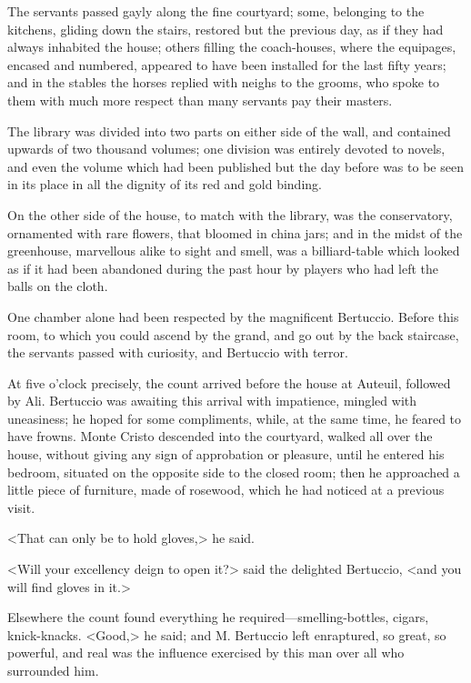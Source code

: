  The servants passed gayly along the fine courtyard; some, belonging to the kitchens, gliding down the stairs, restored but the previous day, as if they had always inhabited the house; others filling the coach-houses, where the equipages, encased and numbered, appeared to have been installed for the last fifty years; and in the stables the horses replied with neighs to the grooms, who spoke to them with much more respect than many servants pay their masters. 

 The library was divided into two parts on either side of the wall, and contained upwards of two thousand volumes; one division was entirely devoted to novels, and even the volume which had been published but the day before was to be seen in its place in all the dignity of its red and gold binding. 

 On the other side of the house, to match with the library, was the conservatory, ornamented with rare flowers, that bloomed in china jars; and in the midst of the greenhouse, marvellous alike to sight and smell, was a billiard-table which looked as if it had been abandoned during the past hour by players who had left the balls on the cloth. 

 One chamber alone had been respected by the magnificent Bertuccio. Before this room, to which you could ascend by the grand, and go out by the back staircase, the servants passed with curiosity, and Bertuccio with terror. 

 At five o'clock precisely, the count arrived before the house at Auteuil, followed by Ali. Bertuccio was awaiting this arrival with impatience, mingled with uneasiness; he hoped for some compliments, while, at the same time, he feared to have frowns. Monte Cristo descended into the courtyard, walked all over the house, without giving any sign of approbation or pleasure, until he entered his bedroom, situated on the opposite side to the closed room; then he approached a little piece of furniture, made of rosewood, which he had noticed at a previous visit. 

 <That can only be to hold gloves,> he said. 

 <Will your excellency deign to open it?> said the delighted Bertuccio, <and you will find gloves in it.> 

 Elsewhere the count found everything he required—smelling-bottles, cigars, knick-knacks.  <Good,> he said; and M. Bertuccio left enraptured, so great, so powerful, and real was the influence exercised by this man over all who surrounded him. 

